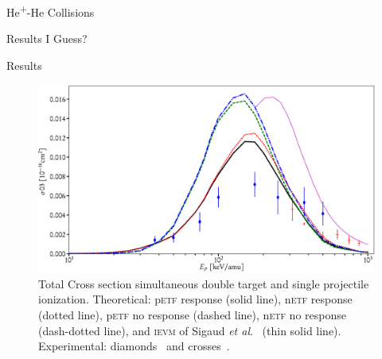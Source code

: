 \documentclass[letterpaper, 11 pt]{report}
\begin{document}
\begin{chapter}{\texorpdfstring{He\textsuperscript{+}}{He+}-He Collisions \label{chap:hephe}}
\begin{section}{Results I Guess? \label{sec:hephe-disc}}
\begin{subsection}{Results \label{sec:hephe-res}}
         \begin{figure}[t]
            \centering
            \includegraphics[width = \linewidth]{./images/hephe-cross/HepHe-003.eps}
            \caption[Total Cross section simultaneous double target and single projectile ionization in
                     He\textsuperscript{+}-He collisions.]
                    {Total Cross section simultaneous double target and single projectile ionization.
                     Theoretical: p\textsc{etf} response (solid line), n\textsc{etf} response (dotted
                                  line),
                                  p\textsc{etf} no response (dashed line), n\textsc{etf} no response
                                  (dash-dotted line), and
                                  \textsc{ievm} of Sigaud \textit{et al}.~\cite{SM-03} (thin solid line).
                     Experimental: diamonds~\cite{Dub-89} and crosses~\cite{SSMSM-11}. \label{fig:cs003}}
         \end{figure}

         \begin{figure}[t]
            \begin{minipage}{.49\linewidth}
               

\end{minipage}
\end{figure}
\end{subsection}
\end{section}
\end{chapter}
\end{document}
